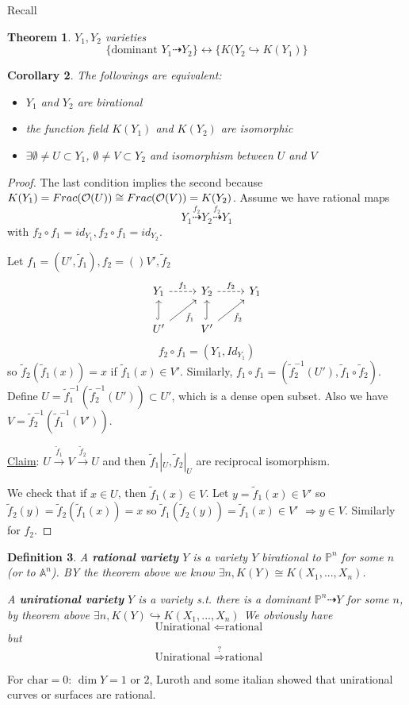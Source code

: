 \documentclass[11pt]{article}
\newtheorem{thm}{Theorem}[section]
\newtheorem{cor}[thm]{Corollary}
\newtheorem{dfn}[thm]{Definition}
\newcommand{\affn}{\mathbb A}
\newcommand{\proj}{\mathbb P}
\newcommand{\calo}{{\cal O}}
\newcommand{\drta}{\dashrightarrow}
\newcommand{\Lrta}{\Longrightarrow}
\newcommand{\lrta}{\longrightarrow}
\newcommand{\llrta}{\longleftrightarrow}
\newcommand{\Llta}{\Longleftarrow}
\newcommand{\inj}{\hookrightarrow}
\begin{document}
Recall
\begin{thm} $Y_1,Y_2$ varieties
$$\{ \text{dominant }Y_1\dashrightarrow Y_2\}\llrta\{K(Y_2\inj K(Y_1)\}$$
\end{thm}
\begin{cor}The followings are equivalent:
\begin{itemize}
	\item
$Y_1$  and $Y_2$ are birational \item the function field $K(Y_1)$ and $K(Y_2)$ are isomorphic
\item $\exists \emptyset \neq U\subset Y_1$, $\emptyset \neq V\subset Y_2$ and isomorphism between $U$ and $V$
\end{itemize}
\end{cor}
\begin{proof}
The last condition implies the second because $K(Y_1)=Frac(\calo(U))\cong Frac(\calo(V))=K(Y_2)$. Assume we have rational maps 
$$
Y_1\overset{f_2}{\drta}Y_2\overset{f_2}{\drta} Y_1
$$
with $f_2\circ f_1=id_{Y_1}, f_2\circ f_1= id_{Y_2}$. 

Let $f_1=(U',\tilde{f}_1), f_2=()V',\tilde{f}_2$
\[
\begin{tikzcd}
Y_1 \arrow[r, dashed,"f_1"] & Y_2 \arrow[r, dashed,"f_2"] & Y_1 \\
U' \arrow[ru, "\tilde{f}_1"'] \arrow[u,hook] & V' \arrow[ru, "\tilde{f}_2"'] \arrow[u, hook] & 
\end{tikzcd}
\]
$$
f_2\circ f_1=(Y_1,Id_{Y_1})
$$
so $\tilde{f}_2(\tilde{f}_1(x))=x$ if $\tilde{f}_1(x)\in V'$.
Similarly, $f_1\circ f_1=(\tilde{f}_2^{-1}(U'),\tilde{f}_1\circ \tilde{f}_2)$. Define $U=\tilde{f}^{-1}_{1}(\tilde{f}_{2}^{-1}(U'))\subset U'$, which is a dense open subset. Also we have $V=\tilde{f}^{-1}_{2}(\tilde{f}_{1}^{-1}(V'))$.

\underline{Claim}: $U\overset{\tilde{f}_1}{\lrta }V\overset{\tilde{f}_2}{\lrta} U$ and then $\tilde{f}_1|_U,\tilde{f}_2|_U$ are reciprocal isomorphism.

We check that if $x\in  U$, then $\tilde{f}_1(x)\in V$.
Let $y=\tilde{f}_1(x)\in V'$ so $\tilde{f}_2(y)=\tilde{f}_2(\tilde{f}_1(x))=x$ so $\tilde{f}_1(\tilde{f}_2(y))=\tilde{f}_1(x)\in V'$ $\Lrta y\in V$. Similarly for $f_2$.
\end{proof}

\begin{dfn}
A \textbf{rational variety} $Y$ is a variety $Y$ birational to $\proj^n$ for some $n$ (or to $\affn^n$). BY the theorem above we know $\exists n, K(Y)\cong K(X_1,...,X_n)$. 

A \textbf{unirational variety} $Y$ is a variety s.t. there is a dominant $\proj^n\drta Y$ for some $n$, by theorem above $\exists n, K(Y)\inj K(X_1,...,X_n)$
We obviously have
$$
\text{ Unirational } \Llta \text{rational}
$$
but 
$$
\text{ Unirational } \overset{?}{\Lrta} \text{rational}
$$
\end{dfn}
For $\text{char}= 0$: $\dim Y=1$ or $2$, Luroth and some italian showed that unirational curves or surfaces are rational.
\end{document}
